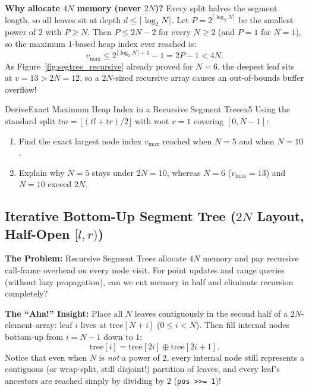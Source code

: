 \documentclass[11pt,a4paper]{article}
\theoremstyle{definition}
\newcommand{\painbeat}{\textbf{\color{accentamber}The Problem:} }
\newcommand{\ahabeat}{\textbf{\color{accentteal}The ``Aha!'' Insight:} }
\begin{document}
\textbf{Why allocate $4N$ memory (never $2N$)?} Every split halves the segment length, so all leaves sit at depth $d \le \lceil \log_2 N \rceil$. Let $P = 2^{\lceil \log_2 N \rceil}$ be the smallest power of $2$ with $P \ge N$. Then $P \le 2N - 2$ for every $N \ge 2$ (and $P = 1$ for $N = 1$), so the maximum $1$-based heap index ever reached is:
$$v_{\max} \le 2^{\lceil \log_2 N \rceil + 1} - 1 = 2P - 1 < 4N.$$
As Figure~\ref{fig:segtree_recursive} already proved for $N = 6$, the deepest leaf sits at $v = 13 > 2N = 12$, so a $2N$-sized recursive array causes an out-of-bounds buffer overflow!

\begin{tryitbox}{Derive}{Exact Maximum Heap Index in a Recursive Segment Tree}{ex5}
Using the standard split $tm = \lfloor (tl + tr) / 2 \rfloor$ with root $v = 1$ covering $[0, N - 1]$:
\begin{enumerate}[itemsep=2pt, topsep=2pt]
    \item Find the exact largest node index $v_{\max}$ reached when $N = 5$ and when $N = 10$.
    \item Explain why $N = 5$ stays under $2N = 10$, whereas $N = 6$ ($v_{\max} = 13$) and $N = 10$ exceed $2N$.
\end{enumerate}
\end{tryitbox}

\subsection{Iterative Bottom-Up Segment Tree (\texorpdfstring{$2N$}{2N} Layout, Half-Open \texorpdfstring{$[l, r)$}{[l, r)})}

\painbeat Recursive Segment Trees allocate $4N$ memory and pay recursive call-frame overhead on every node visit. For point updates and range queries (without lazy propagation), can we cut memory in half and eliminate recursion completely?

\ahabeat Place all $N$ leaves contiguously in the second half of a $2N$-element array: leaf $i$ lives at $\text{tree}[N + i]$ ($0 \le i < N$). Then fill internal nodes bottom-up from $i = N - 1$ down to $1$:
$$\text{tree}[i] = \text{tree}[2i] \oplus \text{tree}[2i + 1].$$
Notice that even when $N$ is \emph{not} a power of $2$, every internal node still represents a contiguous (or wrap-split, still disjoint!) partition of leaves, and every leaf's ancestors are reached simply by dividing by $2$ (\texttt{pos >>= 1})!
\end{document}
